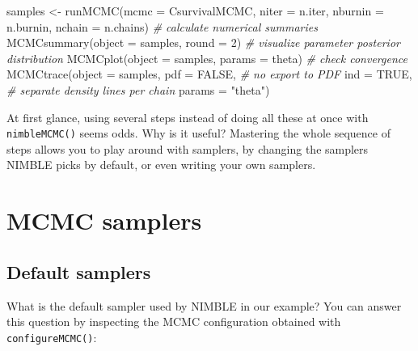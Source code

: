 \documentclass[
  12pt,
]{krantz}
\newenvironment{Shaded}{\begin{snugshade}}{\end{snugshade}}
\newcommand{\AttributeTok}[1]{\textcolor[rgb]{0.77,0.63,0.00}{#1}}
\newcommand{\CommentTok}[1]{\textcolor[rgb]{0.56,0.35,0.01}{\textit{#1}}}
\newcommand{\ConstantTok}[1]{\textcolor[rgb]{0.00,0.00,0.00}{#1}}
\newcommand{\DecValTok}[1]{\textcolor[rgb]{0.00,0.00,0.81}{#1}}
\newcommand{\DocumentationTok}[1]{\textcolor[rgb]{0.56,0.35,0.01}{\textbf{\textit{#1}}}}
\newcommand{\FunctionTok}[1]{\textcolor[rgb]{0.00,0.00,0.00}{#1}}
\newcommand{\NormalTok}[1]{#1}
\newcommand{\OtherTok}[1]{\textcolor[rgb]{0.56,0.35,0.01}{#1}}
\newcommand{\SpecialCharTok}[1]{\textcolor[rgb]{0.00,0.00,0.00}{#1}}
\newcommand{\StringTok}[1]{\textcolor[rgb]{0.31,0.60,0.02}{#1}}
\begin{document}
\begin{Shaded}
\begin{Highlighting}[]
\NormalTok{samples }\OtherTok{\textless{}{-}} \FunctionTok{runMCMC}\NormalTok{(}\AttributeTok{mcmc =}\NormalTok{ CsurvivalMCMC, }
                   \AttributeTok{niter =}\NormalTok{ n.iter,}
                   \AttributeTok{nburnin =}\NormalTok{ n.burnin,}
                   \AttributeTok{nchain =}\NormalTok{ n.chains)}
\CommentTok{\# calculate numerical summaries}
\FunctionTok{MCMCsummary}\NormalTok{(}\AttributeTok{object =}\NormalTok{ samples, }\AttributeTok{round =} \DecValTok{2}\NormalTok{)}
\CommentTok{\# visualize parameter posterior distribution}
\FunctionTok{MCMCplot}\NormalTok{(}\AttributeTok{object =}\NormalTok{ samples, }
         \AttributeTok{params =} \StringTok{\textquotesingle{}theta\textquotesingle{}}\NormalTok{)}
\CommentTok{\# check convergence}
\FunctionTok{MCMCtrace}\NormalTok{(}\AttributeTok{object =}\NormalTok{ samples,}
          \AttributeTok{pdf =} \ConstantTok{FALSE}\NormalTok{, }\CommentTok{\# no export to PDF}
          \AttributeTok{ind =} \ConstantTok{TRUE}\NormalTok{, }\CommentTok{\# separate density lines per chain}
          \AttributeTok{params =} \StringTok{"theta"}\NormalTok{)}
\end{Highlighting}
\end{Shaded}

At first glance, using several steps instead of doing all these at once with \texttt{nimbleMCMC()} seems odds. Why is it useful? Mastering the whole sequence of steps allows you to play around with samplers, by changing the samplers NIMBLE picks by default, or even writing your own samplers.

\hypertarget{mcmc-samplers}{%
\section{MCMC samplers}\label{mcmc-samplers}}

\hypertarget{change-sampler}{%
\subsection{Default samplers}\label{change-sampler}}

What is the default sampler used by NIMBLE in our example? You can answer this question by inspecting the MCMC configuration obtained with \texttt{configureMCMC()}:

\begin{Shaded}
\end{Shaded}
\end{document}
